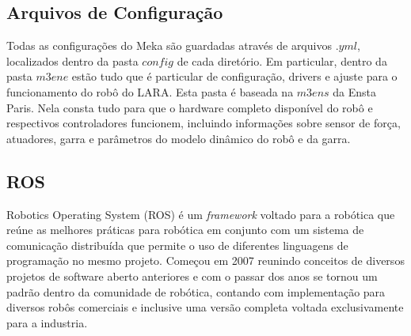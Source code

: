 
\subsection{Arquivos de Configuração}

Todas as configurações do Meka são guardadas através de arquivos $.yml$, localizados dentro da pasta $config$ de cada diretório. Em particular, dentro da pasta $m3ene$ estão tudo que é particular de configuração, drivers e ajuste para o funcionamento do robô do LARA. Esta pasta é baseada na $m3ens$ da Ensta Paris. Nela consta tudo para que o hardware completo disponível do robô e respectivos controladores funcionem, incluindo informações sobre sensor de força, atuadores, garra e parâmetros do modelo dinâmico do robô e da garra.

\subsection{ROS}

Robotics Operating System (ROS) é um \textit{framework} voltado para a robótica que reúne as melhores práticas para robótica em conjunto com um sistema de comunicação distribuída que permite o uso de diferentes linguagens de programação no mesmo projeto. Começou em 2007 reunindo conceitos de diversos projetos de software aberto anteriores e com o passar dos anos se tornou um padrão dentro da comunidade de robótica, contando com implementação para diversos robôs comerciais e inclusive uma versão completa voltada exclusivamente para a industria. \cite{nobody}



